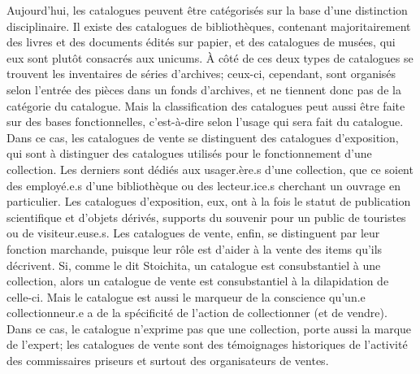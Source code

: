 Aujourd'hui, les catalogues peuvent être catégorisés sur la base d'une distinction disciplinaire. Il existe des catalogues de bibliothèques, contenant majoritairement des livres et des documents édités sur papier, et des catalogues de musées, qui eux sont plutôt consacrés aux unicums. À côté de ces deux types de catalogues se trouvent les inventaires de séries d'archives; ceux-ci, cependant, sont organisés selon l'entrée des pièces dans un fonds d'archives, et ne tiennent donc pas de la catégorie du catalogue. Mais la classification des catalogues peut aussi être faite sur des bases fonctionnelles, c'est-à-dire selon l'usage qui sera fait du catalogue. Dans ce cas, les catalogues de vente se distinguent des catalogues d'exposition, qui sont à distinguer des catalogues utilisés pour le fonctionnement d'une collection. Les derniers sont dédiés aux usager.ère.s d'une collection, que ce soient des employé.e.s d'une bibliothèque ou des lecteur.ice.s cherchant un ouvrage en particulier. Les catalogues d'exposition, eux, ont à la fois le statut de publication scientifique et d'objets dérivés, supports du souvenir pour un public de touristes ou de visiteur.euse.s. Les catalogues de vente, enfin, se distinguent par leur fonction marchande, puisque leur rôle est d'aider à la vente des items qu'ils décrivent. Si, comme le dit Stoichita, un catalogue est consubstantiel à une collection, alors un catalogue de vente est consubstantiel à la dilapidation de celle-ci. Mais le catalogue est aussi le marqueur de la conscience qu'un.e collectionneur.e a de la spécificité de l'action de collectionner (et de vendre). Dans ce cas, le catalogue n'exprime pas que une collection, porte aussi la marque de l'expert; les catalogues de vente sont des témoignages historiques de l'activité des commissaires priseurs et surtout des organisateurs de ventes.

